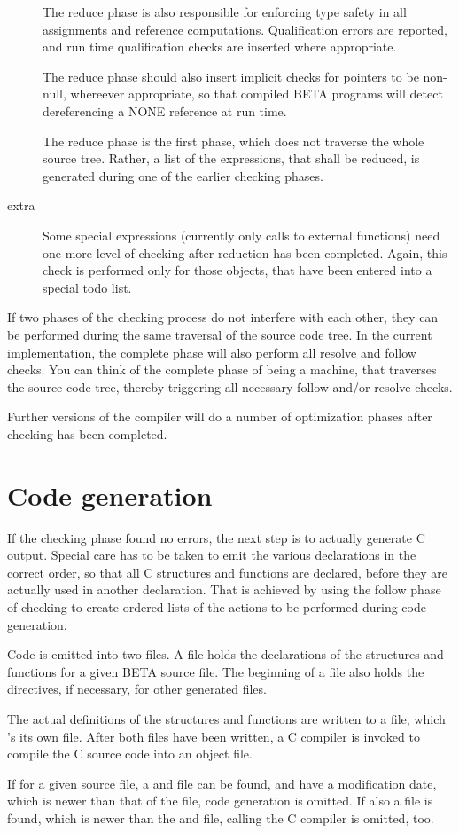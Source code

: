 \begin{description}
    The reduce phase is also responsible for enforcing type
    safety in all assignments and reference computations.
    Qualification errors are reported, and run time qualification
    checks are inserted where appropriate.

    The reduce phase should also insert implicit checks for
    pointers to be non-null, whereever appropriate, so that
    compiled BETA programs will detect dereferencing a NONE
    reference at run time.

    The reduce phase is the first phase, which does not traverse
    the whole source tree.  Rather, a list of the expressions,
    that shall be reduced, is generated during one of the earlier
    checking phases.
\item[extra] Some special expressions (currently only calls to
    external functions) need one more level of checking after
    reduction has been completed.  Again, this check is performed
    only for those objects, that have been entered into a special
    todo list.
\end{description}

If two phases of the checking process do not interfere with each
other, they can be performed during the same traversal of the
source code tree.  In the current implementation, the complete
phase will also perform all resolve and follow checks.  You can
think of the complete phase of being a machine, that traverses
the source code tree, thereby triggering all necessary follow
and/or resolve checks.

Further versions of the compiler will do a number of optimization
phases after checking has been completed.

\section{Code generation}
If the checking phase found no errors, the next step is to actually
generate C output.  Special care has to be taken to emit the
various declarations in the correct order, so that all C
structures and functions are declared, before they are actually
used in another declaration.
That is achieved by using the follow phase of checking to create
ordered lists of the actions to be performed during code
generation.

Code is emitted into two files.  A  file holds the
declarations of the structures and functions for a given BETA
source file.  The beginning of a  file also holds the
 directives, if necessary, for other generated
 files.

The actual definitions of the structures and functions are
written to a  file, which 's its own 
file.  After both files have been written, a C compiler is
invoked to compile the C source code into an object file.

If for a given  source file, a  and  file
can be found, and have a modification date, which is newer than
that of the  file, code generation is omitted.  If also
a  file is found, which is newer than the  and
 file, calling the C compiler is omitted, too.
